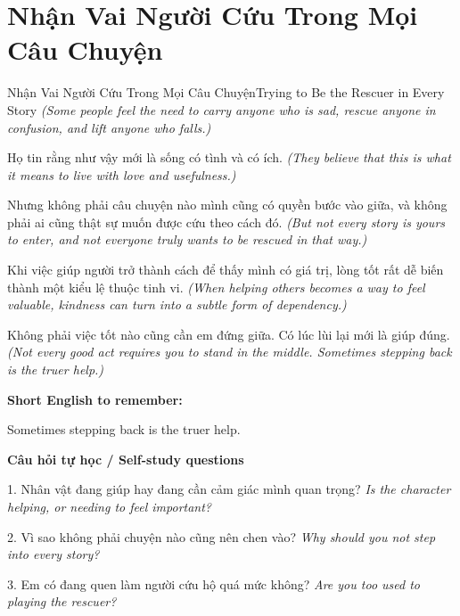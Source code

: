 \section{Nhận Vai Người Cứu Trong Mọi Câu Chuyện}
\begin{truyen}{Nhận Vai Người Cứu Trong Mọi Câu Chuyện}{Trying to Be the Rescuer in Every Story}
\textit{(Some people feel the need to carry anyone who is sad, rescue anyone in confusion, and lift anyone who falls.)}

Họ tin rằng như vậy mới là sống có tình và có ích.
\textit{(They believe that this is what it means to live with love and usefulness.)}

Nhưng không phải câu chuyện nào mình cũng có quyền bước vào giữa, và không phải ai cũng thật sự muốn được cứu theo cách đó.
\textit{(But not every story is yours to enter, and not everyone truly wants to be rescued in that way.)}

Khi việc giúp người trở thành cách để thấy mình có giá trị, lòng tốt rất dễ biến thành một kiểu lệ thuộc tinh vi.
\textit{(When helping others becomes a way to feel valuable, kindness can turn into a subtle form of dependency.)}

\end{truyen}

\begin{baihoc}
Không phải việc tốt nào cũng cần em đứng giữa. Có lúc lùi lại mới là giúp đúng.
\textit{(Not every good act requires you to stand in the middle. Sometimes stepping back is the truer help.)}
\end{baihoc}

\begin{ghinhoanh}
\textbf{Short English to remember:}

Sometimes stepping back is the truer help.

\end{ghinhoanh}

\begin{tuhocnhanh}
\textbf{Câu hỏi tự học / Self-study questions}

1. Nhân vật đang giúp hay đang cần cảm giác mình quan trọng? \textit{Is the character helping, or needing to feel important?}

2. Vì sao không phải chuyện nào cũng nên chen vào? \textit{Why should you not step into every story?}

3. Em có đang quen làm người cứu hộ quá mức không? \textit{Are you too used to playing the rescuer?}
\end{tuhocnhanh}
\ngancach

